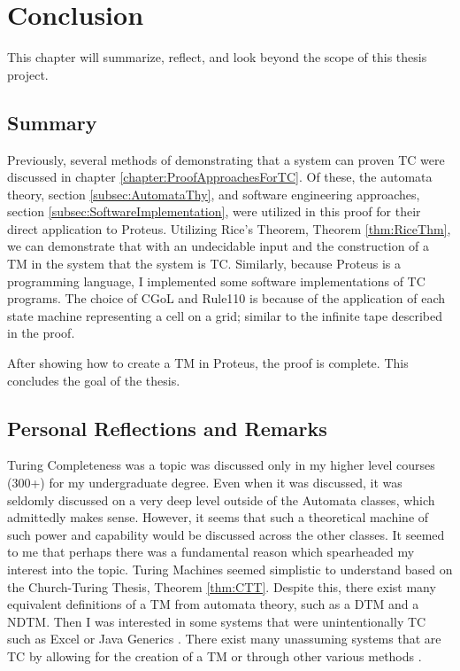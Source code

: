 \chapter{Conclusion}\label{chapter:Concl}

This chapter will summarize, reflect, and look beyond the scope of this thesis project.

\section{Summary}\label{sec:summary}

Previously, several methods of demonstrating that a system can proven TC were discussed in chapter \ref{chapter:ProofApproachesForTC}.
Of these, the automata theory, section \ref{subsec:AutomataThy}, and software engineering approaches, section \ref{subsec:SoftwareImplementation}, were utilized in this proof for their direct application to Proteus.
Utilizing Rice's Theorem, Theorem \ref{thm:RiceThm}, we can demonstrate that with an undecidable input and the construction of a TM in the system that the system is TC.
Similarly, because Proteus is a programming language, I implemented some software implementations of TC programs.
The choice of CGoL and Rule110 is because of the application of each state machine representing a cell on a grid; similar to the infinite tape described in the proof.

After showing how to create a TM in Proteus, the proof is complete.
This concludes the goal of the thesis.

\section{Personal Reflections and Remarks}\label{sec:RefRem}

Turing Completeness was a topic was discussed only in my higher level courses (300+) for my undergraduate degree.
Even when it was discussed, it was seldomly discussed on a very deep level outside of the Automata classes, which admittedly makes sense.
However, it seems that such a theoretical machine of such power and capability would be discussed across the other classes.
It seemed to me that perhaps there was a fundamental reason which spearheaded my interest into the topic.
Turing Machines seemed simplistic to understand based on the Church-Turing Thesis, Theorem \ref{thm:CTT}.
Despite this, there exist many equivalent definitions of a TM from automata theory, such as a DTM and a NDTM.
Then I was interested in some systems that were unintentionally TC such as Excel or Java Generics \cite{ExcelTC,JavaGenericsTC}.
There exist many unassuming systems that are TC by allowing for the creation of a TM or through other various methods \cite{AccTC,AccTC2}.

